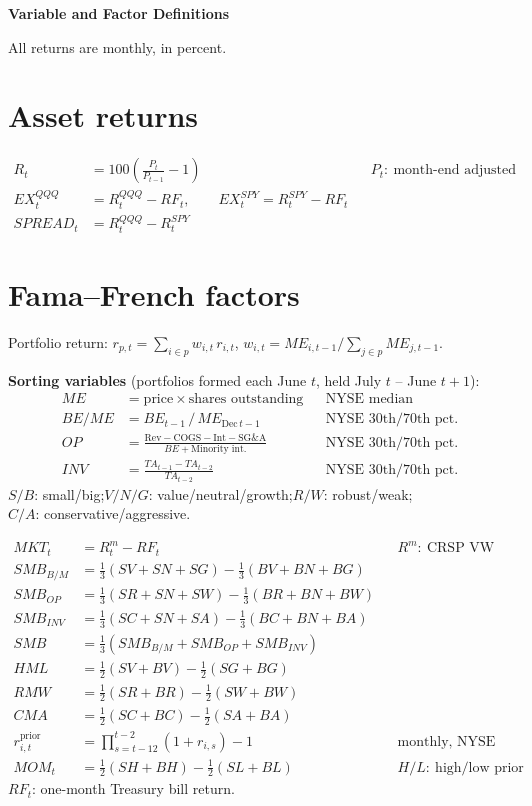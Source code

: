 \documentclass[11pt]{article}
\newcommand{\EX}{\mathit{EX}}
\newcommand{\MKT}{\mathit{MKT}}
\newcommand{\SMB}{\mathit{SMB}}
\newcommand{\HML}{\mathit{HML}}
\newcommand{\RMW}{\mathit{RMW}}
\newcommand{\CMA}{\mathit{CMA}}
\newcommand{\MOM}{\mathit{MOM}}
\newcommand{\RF}{\mathit{RF}}
\newcommand{\ME}{\mathit{ME}}
\newcommand{\BE}{\mathit{BE}}
\newcommand{\OP}{\mathit{OP}}
\newcommand{\INV}{\mathit{INV}}
\newcommand{\TA}{\mathit{TA}}
\begin{document}
\begin{center}{\large\bfseries Variable and Factor Definitions}\end{center}

All returns are monthly, in percent.

\section*{Asset returns}
\begin{align}
R_t &= 100\left(\frac{P_t}{P_{t-1}}-1\right) && P_t:\ \text{month-end adjusted close} \\
\EX^{QQQ}_t &= R^{QQQ}_t-\RF_t, \qquad \EX^{SPY}_t = R^{SPY}_t-\RF_t \\
\mathit{SPREAD}_t &= R^{QQQ}_t-R^{SPY}_t
\end{align}

\section*{Fama--French factors}
Portfolio return: $r_{p,t}=\sum_{i\in p} w_{i,t}\,r_{i,t}$, \quad $w_{i,t}=\ME_{i,t-1}/\sum_{j\in p}\ME_{j,t-1}$.

\textbf{Sorting variables} (portfolios formed each June $t$, held July $t$ -- June $t+1$):
\begin{align}
\ME &= \text{price}\times\text{shares outstanding} && \text{NYSE median} \\
\BE/\ME &= \BE_{t-1}\,/\,\ME_{\text{Dec}\,t-1} && \text{NYSE 30th/70th pct.} \\
\OP &= \frac{\text{Rev}-\text{COGS}-\text{Int}-\text{SG\&A}}{\BE+\text{Minority int.}} && \text{NYSE 30th/70th pct.} \\
\INV &= \frac{\TA_{t-1}-\TA_{t-2}}{\TA_{t-2}} && \text{NYSE 30th/70th pct.}
\end{align}
$S/B$: small/big;\quad $V/N/G$: value/neutral/growth;\quad $R/W$: robust/weak;\\ $C/A$: conservative/aggressive.

\begin{align}
\MKT_t &= R^m_t-\RF_t && R^m:\ \text{CRSP VW market} \\
\SMB_{B/M} &= \tfrac13(SV+SN+SG)-\tfrac13(BV+BN+BG) \\
\SMB_{OP} &= \tfrac13(SR+SN+SW)-\tfrac13(BR+BN+BW) \\
\SMB_{INV} &= \tfrac13(SC+SN+SA)-\tfrac13(BC+BN+BA) \\
\SMB &= \tfrac13\left(\SMB_{B/M}+\SMB_{OP}+\SMB_{INV}\right) \\
\HML &= \tfrac12(SV+BV)-\tfrac12(SG+BG) \\
\RMW &= \tfrac12(SR+BR)-\tfrac12(SW+BW) \\
\CMA &= \tfrac12(SC+BC)-\tfrac12(SA+BA) \\
r^{\text{prior}}_{i,t} &= \textstyle\prod_{s=t-12}^{t-2}(1+r_{i,s})-1 && \text{monthly, NYSE 30/70 pct.} \\
\MOM_t &= \tfrac12(SH+BH)-\tfrac12(SL+BL) && H/L:\ \text{high/low prior ret.}
\end{align}
$\RF_t$: one-month Treasury bill return.
\end{document}
